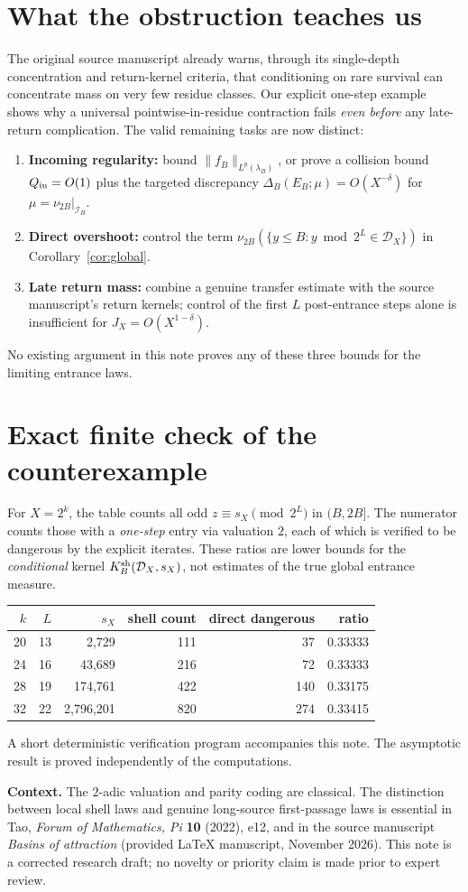 \documentclass[10pt]{amsart}
\theoremstyle{definition}\newtheorem{definition}{Definition}
\theoremstyle{remark}\newtheorem{remark}{Remark}
\newcommand{\cI}{\mathcal I}
\newcommand{\cD}{\mathcal D}
\begin{document}
\section{What the obstruction teaches us}
The original source manuscript already warns, through its single-depth concentration and return-kernel criteria, that conditioning on rare survival can concentrate mass on very few residue classes. Our explicit one-step example shows why a universal pointwise-in-residue contraction fails \emph{even before} any late-return complication. The valid remaining tasks are now distinct:
\begin{enumerate}
\item \textbf{Incoming regularity:} bound $\|f_B\|_{L^p(\lambda_B)}$, or prove a collision bound $Q_{\rm in}=O(1)$ plus the targeted discrepancy $\Delta_B(E_B;\mu)=O(X^{-\delta})$ for $\mu=\nu_{2B}|_{\cI_B}$.
\item \textbf{Direct overshoot:} control the term $\nu_{2B}(\{y\le B:y\bmod2^L\in\cD_X\})$ in Corollary~\ref{cor:global}.
\item \textbf{Late return mass:} combine a genuine transfer estimate with the source manuscript's return kernels; control of the first $L$ post-entrance steps alone is insufficient for $J_X=O(X^{1-\delta})$.
\end{enumerate}
No existing argument in this note proves any of these three bounds for the limiting entrance laws.

\section{Exact finite check of the counterexample}
For $X=2^k$, the table counts all odd $z\equiv s_X\pmod{2^L}$ in $(B,2B]$. The numerator counts those with a \emph{one-step} entry via valuation $2$, each of which is verified to be dangerous by the explicit iterates. These ratios are lower bounds for the \emph{conditional} kernel $K_B^{\rm sh}(\cD_X,s_X)$, not estimates of the true global entrance measure.
\begin{center}
\begin{tabular}{rrrrrr}
\toprule
$k$ & $L$ & $s_X$ & shell count & direct dangerous & ratio\\
\midrule
20 &13 &2,729 &111 &37 &0.33333\\
24 &16 &43,689&216 &72 &0.33333\\
28 &19 &174,761&422 &140&0.33175\\
32 &22 &2,796,201&820&274&0.33415\\
\bottomrule
\end{tabular}
\end{center}
A short deterministic verification program accompanies this note. The asymptotic result is proved independently of the computations.

\bigskip
\noindent\textbf{Context.} The $2$-adic valuation and parity coding are classical. The distinction between local shell laws and genuine long-source first-passage laws is essential in Tao, \emph{Forum of Mathematics, Pi} \textbf{10} (2022), e12, and in the source manuscript \emph{Basins of attraction} (provided LaTeX manuscript, November 2026). This note is a corrected research draft; no novelty or priority claim is made prior to expert review.
\end{document}
